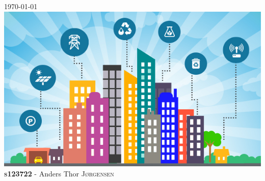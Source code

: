 \begin{titlepage}

{\large \today}\\[2cm] %

\includegraphics[scale=0.45]{figures/frontlogo.png}\\[2cm]
\textbf{\textsc{s123722}} - Anders Thor \textsc{Jørgensen}\\
\vfill %

\end{titlepage}
